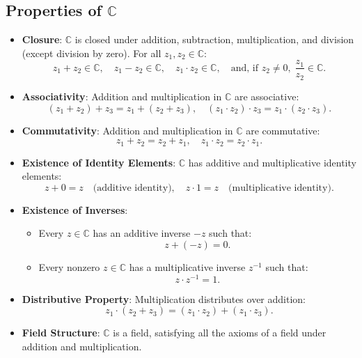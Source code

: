 \subsection{Properties of \( \mathbb{C} \)}
\begin{itemize}
    \item \textbf{Closure}: \( \mathbb{C} \) is closed under addition, subtraction, multiplication, and division (except division by zero). For all \( z_1, z_2 \in \mathbb{C} \):
    \[
    z_1 + z_2 \in \mathbb{C}, \quad z_1 - z_2 \in \mathbb{C}, \quad z_1 \cdot z_2 \in \mathbb{C}, \quad \text{and, if } z_2 \neq 0, \; \frac{z_1}{z_2} \in \mathbb{C}.
    \]

    \item \textbf{Associativity}: Addition and multiplication in \( \mathbb{C} \) are associative:
    \[
    (z_1 + z_2) + z_3 = z_1 + (z_2 + z_3), \quad (z_1 \cdot z_2) \cdot z_3 = z_1 \cdot (z_2 \cdot z_3).
    \]

    \item \textbf{Commutativity}: Addition and multiplication in \( \mathbb{C} \) are commutative:
    \[
    z_1 + z_2 = z_2 + z_1, \quad z_1 \cdot z_2 = z_2 \cdot z_1.
    \]

    \item \textbf{Existence of Identity Elements}: \( \mathbb{C} \) has additive and multiplicative identity elements:
    \[
    z + 0 = z \quad \text{(additive identity)}, \quad z \cdot 1 = z \quad \text{(multiplicative identity)}.
    \]

    \item \textbf{Existence of Inverses}:
    \begin{itemize}
        \item Every \( z \in \mathbb{C} \) has an additive inverse \( -z \) such that:
        \[
        z + (-z) = 0.
        \]
        \item Every nonzero \( z \in \mathbb{C} \) has a multiplicative inverse \( z^{-1} \) such that:
        \[
        z \cdot z^{-1} = 1.
        \]
    \end{itemize}

    \item \textbf{Distributive Property}: Multiplication distributes over addition:
    \[
    z_1 \cdot (z_2 + z_3) = (z_1 \cdot z_2) + (z_1 \cdot z_3).
    \]

\vspace{\baselineskip}\par
    \item \textbf{Field Structure}: \( \mathbb{C} \) is a field, satisfying all the axioms of a field under addition and multiplication.


\end{itemize}
